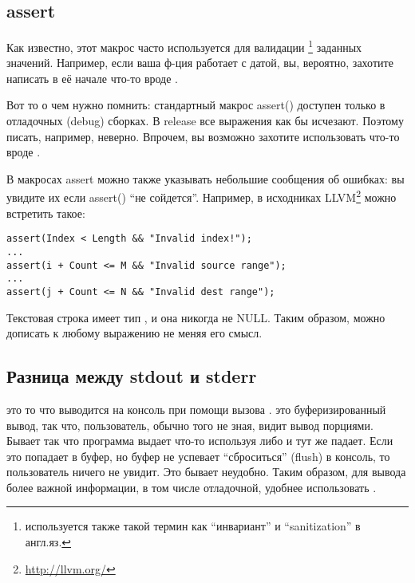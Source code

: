 ﻿\chapter{}

\section{assert}

Как известно, этот макрос часто используется для валидации
\footnote{используется также такой термин как ``инвариант'' и ``sanitization'' в англ.яз.} заданных значений. 
Например, если ваша ф-ция
работает с датой, вы, вероятно, захотите написать в её начале что-то вроде .

Вот то о чем нужно помнить: стандартный макрос assert() доступен только в отладочных (debug) сборках. В release
все выражения как бы исчезают. Поэтому писать, например,  неверно. Впрочем,
вы возможно захотите использовать что-то вроде .

В макросах assert можно также указывать небольшие сообщения об ошибках: 
вы увидите их если assert() ``не сойдется''. 
Например, в исходниках LLVM\footnote{\url{http://llvm.org/}} можно встретить такое:

\begin{lstlisting}
assert(Index < Length && "Invalid index!");
...
assert(i + Count <= M && "Invalid source range");
...
assert(j + Count <= N && "Invalid dest range");
\end{lstlisting}

Текстовая строка имеет тип , и она никогда не NULL. 
Таким образом, можно дописать к любому выражению  не меняя его смысл.

\section{Разница между stdout и stderr}

 это то что выводится на консоль при помощи вызова .
 это буферизированный вывод,
так что, пользователь, обычно того не зная, видит вывод порциями. Бывает так что программа выдает
что-то используя  либо  и тут же падает.
Если это попадает в буфер, но буфер не успевает
``сброситься'' (flush) в консоль, то пользователь ничего не увидит. Это бывает неудобно.
Таким образом, для вывода более важной информации, в том числе отладочной, удобнее использовать .

